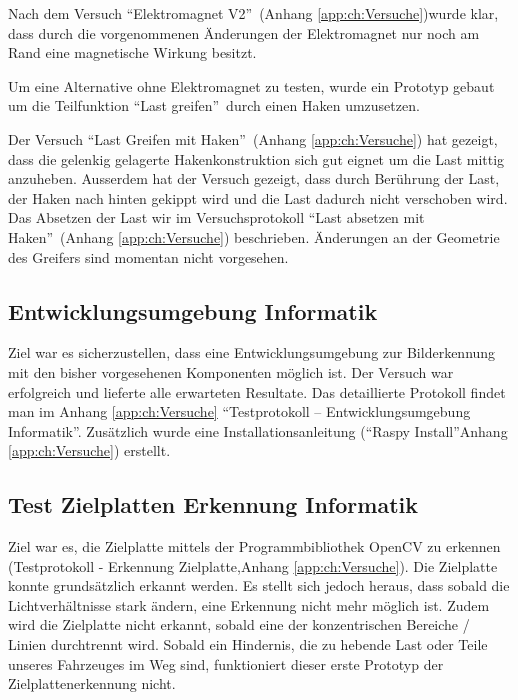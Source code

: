 \documentclass[a4paper]{report}
\begin{document}
Nach dem Versuch \textquotedblleft Elektromagnet V2\textquotedblright\ (Anhang \ref{app:ch:Versuche})wurde klar, dass durch die vorgenommenen Änderungen der Elektromagnet nur noch am Rand eine magnetische Wirkung besitzt.

Um eine Alternative ohne Elektromagnet zu testen, wurde ein Prototyp gebaut um die Teilfunktion \textquotedblleft Last greifen\textquotedblright\ durch einen Haken umzusetzen.

Der Versuch \textquotedblleft Last Greifen mit Haken\textquotedblright\ (Anhang \ref{app:ch:Versuche}) hat gezeigt, dass die gelenkig gelagerte Hakenkonstruktion sich gut eignet um die Last mittig anzuheben. Ausserdem hat der Versuch gezeigt, dass durch Berührung der Last, der Haken nach hinten gekippt wird und die Last dadurch nicht verschoben wird. Das Absetzen der Last wir im Versuchsprotokoll \textquotedblleft Last absetzen mit Haken\textquotedblright\ (Anhang \ref{app:ch:Versuche}) beschrieben. Änderungen an der Geometrie des Greifers sind momentan nicht vorgesehen.

\subsection{Entwicklungsumgebung Informatik}
\label{ssec:VersEntI}
Ziel war es sicherzustellen, dass eine Entwicklungsumgebung zur Bilderkennung mit den bisher vorgesehenen Komponenten möglich ist. Der Versuch war erfolgreich und lieferte alle erwarteten Resultate. Das detaillierte Protokoll findet man im Anhang \ref{app:ch:Versuche} \textquotedblleft Testprotokoll – Entwicklungsumgebung Informatik\textquotedblright.
Zusätzlich wurde eine Installationsanleitung (\textquotedblleft Raspy Install\textquotedblright Anhang \ref{app:ch:Versuche}) erstellt.

\subsection{Test Zielplatten Erkennung Informatik}
\label{ssec:ZielplattenErkennung}
Ziel war es, die Zielplatte mittels der Programmbibliothek OpenCV zu erkennen (Testprotokoll - Erkennung Zielplatte,Anhang \ref{app:ch:Versuche}).
Die Zielplatte konnte grundsätzlich erkannt werden. Es stellt sich jedoch heraus, dass sobald die Lichtverhältnisse stark ändern, eine Erkennung nicht mehr möglich ist. Zudem wird die Zielplatte nicht erkannt, sobald eine der konzentrischen Bereiche / Linien durchtrennt wird. Sobald ein Hindernis, die zu hebende Last oder Teile unseres Fahrzeuges im Weg sind, funktioniert dieser erste Prototyp der Zielplattenerkennung nicht.
\end{document}
